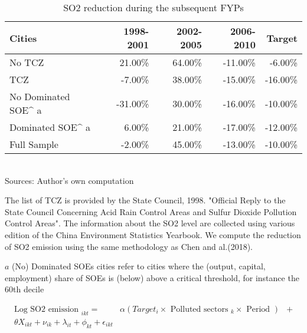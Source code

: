 \documentclass[12pt]{article}
\begin{document}
\begin{table}[!htbp] \centering
\caption{\\ SO2 reduction during the subsequent FYPs}
\label{table_1}
\begin{adjustbox}{width=\textwidth, totalheight=\baselineskip,keepaspectratio}
\begin{tabular}{lrrrr}
\toprule
             Cities &  1998-2001 &  2002-2005 &  2006-2010 &  Target \\
\midrule
             No TCZ &     21.00\% &     64.00\% &    -11.00\% &  -6.00\% \\
                TCZ &     -7.00\% &     38.00\% &    -15.00\% & -16.00\% \\
 No Dominated SOE^ a &    -31.00\% &     30.00\% &    -16.00\% & -10.00\% \\
    Dominated SOE^ a &      6.00\% &     21.00\% &    -17.00\% & -12.00\% \\
        Full Sample &     -2.00\% &     45.00\% &    -13.00\% & -10.00\% \\
\bottomrule
\end{tabular}
\end{adjustbox}
\begin{tablenotes} 
 \small 
 \item \\ 

Sources: Author's own computation \ 

The list of TCZ is provided by the State Council, 1998.
"Official Reply to the State Council Concerning Acid Rain Control Areas
and Sulfur Dioxide Pollution Control Areas".
The information about the SO2 level are collected using various edition
of the China Environment Statistics Yearbook.
We compute the reduction of SO2 emission using the same methodology
as Chen and al.(2018). \ 

$a$ (No) Dominated SOEs cities refer to cities where the 
(output, capital, employment) share of SOEs is (below) above a critical threshold,
for instance the 60th decile
 
\end{tablenotes}
\end{table}

\begin{equation} \label{eq:equation_1}
\begin{aligned} 
\text {Log SO2 emission }_{i k t}=& \alpha (Target_{i} \times \text { Polluted sectors }_{k} \times \text { Period }) 
& + \\ \theta {X}_{i k t}+\nu_{ik}+\lambda_{it} +\phi_{kt} +\epsilon_{ikt}
\end{aligned}
\end{equation}
\end{document}
